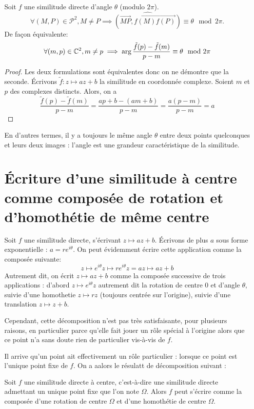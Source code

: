 \begin{proposition}
Soit $f$ une similitude directe d'angle $\theta$ (modulo $2\pi$).
\[ \forall (M,P)\in\mathcal P^2, M\neq P\implies \widehat{(\overrightarrow{MP}, \overrightarrow{f(M)f(P)})} \equiv \theta \mod 2\pi.\]
De façon équivalente:
\[ \forall (m,p)\in\mathbb{C}^2, m\neq p \implies \arg \frac{\tilde f(p)-\tilde f(m)}{p-m}\equiv \theta \mod 2\pi\]
\end{proposition}
\begin{proof}
Les deux formulations sont équivalentes donc on ne démontre que la seconde. Écrivons $\tilde f : z\mapsto az+b$ la similitude en coordonnée complexe. Soient $m$ et $p$ des complexes distincts. Alors, on a 
\[
\frac{\tilde f(p)-\tilde f(m)}{p-m}
= \frac{ap+b-(am+b)}{p-m}
= \frac{a(p-m)}{p-m}
= a
\]
\end{proof}

En d'autres termes, il y a toujours le même angle $\theta$ entre deux points quelconques et leurs deux images : l'angle est une grandeur caractéristique de la similitude.

\section{Écriture d'une similitude à centre comme composée de rotation et d'homothétie de même centre}

Soit $f$ une similitude directe, s'écrivant $z\mapsto az+b$. Écrivons de plus $a$ sous forme exponentielle : $a=re^{i\theta}$. On peut évidemment écrire cette application comme la composée suivante:
\[ z \mapsto e^{i\theta} z\mapsto re^{i\theta}z = az\mapsto az+b\]
Autrement dit, on écrit $z\mapsto az+b$ comme la composée successive de trois applications : d'abord $z\mapsto e^{i\theta}z$ autrement dit la rotation de centre $0$ et d'angle $\theta$, suivie d'une homothetie $z\mapsto rz$ (toujours centrée sur l'origine), suivie d'une translation $z\mapsto z+b$.

Cependant, cette décomposition n'est pas très satisfaisante, pour plusieurs raisons, en particulier parce qu'elle fait jouer un rôle spécial à l'origine alors que ce point n'a sans doute rien de particulier vis-à-vis de $f$.

Il arrive qu'un point ait effectivement un rôle particulier : lorsque ce point est l'unique point fixe de $f$. On a aalors le résulatt de décomposition suivant :

\begin{proposition}
Soit $f$ une similitude directe à centre, c'est-à-dire une similitude directe admettant un unique point fixe que l'on note $\Omega$. Alors $f$ peut s'écrire comme la composée d'une rotation de centre $\Omega$ et d'une homothétie de centre $\Omega$.
\end{proposition}



